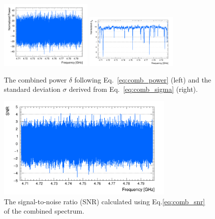 \begin{figure}[h]
    \centering
    \includegraphics[width=0.4\textwidth,height = 0.3\textwidth]{figures/Power_CombSpectrum_AxionRun_AllSteps_Rescan_SG4_W201_LqWeight.png}
    \includegraphics[width=0.4\textwidth,height = 0.3\textwidth]{figures/Sigma_CombSpectrum_AxionRun_AllSteps_Rescan_SG4_W201_LqWeight.png}
    \caption{The combined power $\delta$ following Eq.~\eqref{eq:comb_power} 
(left) and the standard deviation $\sigma$ derived from 
Eq.~\eqref{eq:comb_sigma} (right).}
    \label{fig:power_sigma_comb}
\end{figure}

\begin{figure}[hbt!]
    \centering
    \includegraphics[width=8.6cm]{figures/SNR_CombSpectrum_AxionRun_AllSteps_Rescan_SG4_W201_LqWeight.png}
    \caption{The signal-to-noise ratio (SNR) calculated using 
Eq.\eqref{eq:comb_snr} of the combined spectrum. }
    \label{fig:SNR_comb}
\end{figure}



